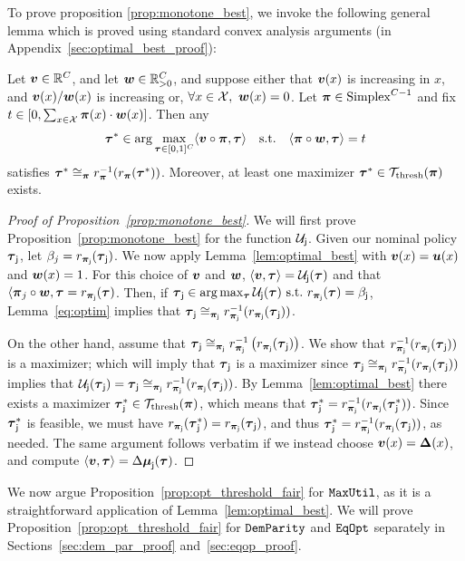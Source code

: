 	To prove proposition \ref{prop:monotone_best}, we invoke the following general lemma which is proved using standard convex analysis arguments (in Appendix~\ref{sec:optimal_best_proof}):
	\begin{lem}\label{lem:optimal_best}
		Let $\boldv \in \R^{\maxscore}$, and let $\boldw \in \R_{>0}^{\maxscore}$, 
		and suppose either that $\boldv(x)$  is increasing in $x$, and $\boldv(x)/\boldw(x)$ is increasing or, $\forall x \in \X,~\boldw(x) = 0$. Let $\dist \in \Simplex$ and fix $t \in [0,\sum_{x \in \X} \dist(x) \cdot \boldw(x)]$. Then any
		\begin{eqnarray}\label{eq:optim}
		\pol^* \in \arg\max_{\pol \in [0,1]^C}\langle \boldv \circ \dist, \pol \rangle \quad \subto \quad \langle \dist \circ \boldw,\pol \rangle = t
		\end{eqnarray}
		satisfies $\pol^* \simpi \ratef_{\dist}^{-1}(\ratef_{\dist}(\pol^*))$. Moreover, at least one maximizer $\pol^* \in \Monotone(\dist)$ exists. 
	\end{lem}
	\begin{proof} [Proof of Proposition~\ref{prop:monotone_best}] 
	We will first prove Proposition~\ref{prop:monotone_best} for the function $\Util\supj$.
	Given our nominal policy $\polj$, let $\accrate_j = \ratef_{\distj}(\polj)$. 
	We now apply Lemma~\ref{lem:optimal_best} with $\boldv(x) = \util(x)$ and $\boldw(x) = 1$. 
	For this choice of $\boldv$ and $\boldw$, $\langle \boldv, \pol \rangle = \Util\supj(\pol)$ and that $\langle \dist_j \circ \boldw,\pol = \ratef_{\distj}(\pol)$. 
	Then, if $\polj \in \arg\max_{\pol}\Util\supj(\pol) ~\subto~\ratef_{\distj}(\pol) = \accrate\supj$, 
	Lemma~\ref{eq:optim} implies that $\polj \simj \ratefj^{-1}(\ratefj(\polj))$. 

	On the other hand, assume that $\polj \simj \ratefj^{-1}\left(\ratefj(\polj)\right)$. 
	We show that $\ratefj^{-1}(\ratefj(\polj))$ is a maximizer; 
	which will imply that $\polj$ is a maximizer since $\polj \simj \ratefj^{-1}(\ratefj(\polj))$ 
	implies that $\Utilj(\polj) = \polj \simj \ratefj^{-1}(\ratefj(\polj))$. 
	By Lemma~\ref{lem:optimal_best} there exists a maximizer $\polj^* \in \Monotone(\dist)$, 
	which means that $\polj^* = \ratefj^{-1}(\ratefj(\polj^*))$. 
	Since  $\polj^*$ is feasible, we must have $\ratefj(\polj^*) = \ratefj(\polj)$, 
	and thus $\polj^* = \ratefj^{-1}(\ratefj(\polj))$, as needed. The same argument follows verbatim if we instead choose $\boldv(x) = \chg(x)$, and compute $\langle \boldv, \pol \rangle = \delmean\supj(\pol)$.
	\end{proof}
	We now argue Proposition~\ref{prop:opt_threshold_fair} for $\maxprof$, as it is a straightforward application of Lemma~\ref{lem:optimal_best}. We will prove Proposition~\ref{prop:opt_threshold_fair} for $\dempar$ and $\eqop$ separately in Sections~\ref{sec:dem_par_proof} and~\ref{sec:eqop_proof}.
	
